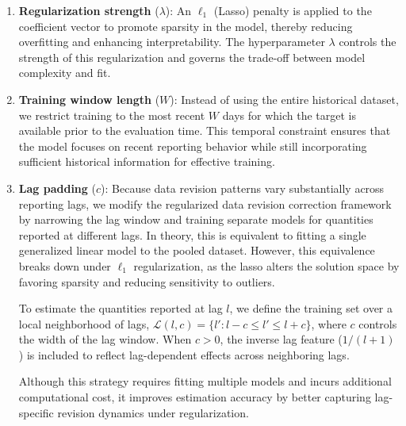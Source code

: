 \begin{enumerate}
    \item \textbf{Regularization strength} ($\lambda$): An $\ell_1$ (Lasso) penalty is applied to the coefficient vector to promote sparsity in the model, thereby reducing overfitting and enhancing interpretability. The hyperparameter $\lambda$ controls the strength of this regularization and governs the trade-off between model complexity and fit.

    \item \textbf{Training window length} ($W$): Instead of using the entire historical dataset, we restrict training to the most recent $W$ days for which the target is available prior to the evaluation time. This temporal constraint ensures that the model focuses on recent reporting behavior while still incorporating sufficient historical information for effective training.
    
    \item \textbf{Lag padding} ($c$): Because data revision patterns vary substantially across reporting lags, we modify the regularized data revision correction framework by narrowing the lag window and training separate models for quantities reported at different lags. In theory, this is equivalent to fitting a single generalized linear model to the pooled dataset. However, this equivalence breaks down under $\ell_1$ regularization, as the lasso alters the solution space by favoring sparsity and reducing sensitivity to outliers.
    
    To estimate the quantities reported at lag $l$, we define the training set over a local neighborhood of lags, $\mathcal{L}(l, c) = \{l': l - c \leq l' \leq l + c\}$, where $c$ controls the width of the lag window. When $c > 0$, the inverse lag feature ($1/(l+1)$ ) is included to reflect lag-dependent effects across neighboring lags.
    
    Although this strategy requires fitting multiple models and incurs additional computational cost, it improves estimation accuracy by better capturing lag-specific revision dynamics under regularization.    


\end{enumerate}
